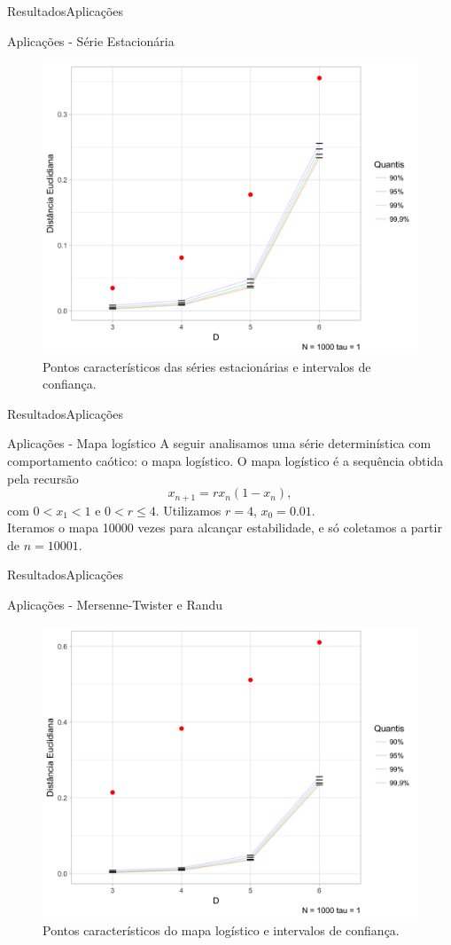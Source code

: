 \documentclass[10pt,xcolor={dvipsnames}]{beamer}
\begin{document}
\begin{frame}{Resultados}{Aplicações}
	\begin{block}{Aplicações - Série Estacionária}
	\begin{figure}
		\centering
		\includegraphics[width=.65\linewidth]{ConfidInt_estacionaria_1k_t1}
		\caption{Pontos característicos das séries estacionárias e intervalos de confiança.}\label{Fig:ConfidInt_estacionaria_1k_t1}
	\end{figure}	
	\end{block}
\end{frame}

\begin{frame}{Resultados}{Aplicações}
	\begin{block}{Aplicações - Mapa logístico}
	A seguir analisamos uma série determinística com comportamento caótico: o mapa logístico.
	O mapa logístico é a sequência obtida pela recursão
	\begin{equation}
	x_{n+1} = r x_n(1-x_n),
	\end{equation}
	com $0<x_1<1$ e $0<r\leq 4$.
	Utilizamos $r=4$, $x_0=0.01$.\\
	Iteramos o mapa \num{10000} vezes para alcançar estabilidade, e só coletamos a partir de $n=10001$.	
	\end{block}
\end{frame}

\begin{frame}{Resultados}{Aplicações}
	\begin{block}{Aplicações - Mersenne-Twister e Randu}
	\begin{figure}
		\centering
		\includegraphics[width=.65\linewidth]{ConfidInt_mapa_logistico_1k_t1}
		\caption{Pontos característicos do mapa logístico e intervalos de confiança.}\label{Fig:ConfidInt_mapa_logistico_1k_t1}
	\end{figure}
	\end{block}
\end{frame}
\end{document}
